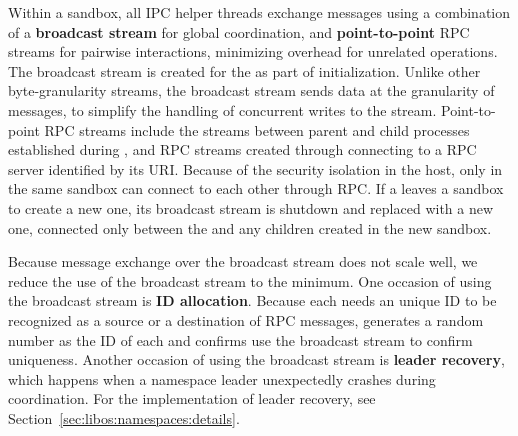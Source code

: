 Within a sandbox, all IPC helper threads exchange messages using a
combination of
a {\bf broadcast stream} for global coordination,
and {\bf point-to-point} RPC streams for pairwise interactions, 
minimizing overhead for unrelated operations.
The broadcast stream is created for the \picoproc{} as part of initialization.
Unlike other byte-granularity streams, the broadcast stream sends data at the granularity of messages,
to simplify the handling of concurrent writes to the stream.
Point-to-point RPC streams include the streams between parent and child processes established during ,
and RPC streams created through connecting to a RPC server
identified by its URI.
Because of the security isolation in the host,
only \picoprocs{} in the same sandbox can connect to each other through RPC.
If a \picoproc{} leaves a sandbox to create a new one,
its broadcast stream is shutdown and replaced
with a new one, connected only between the \picoproc{} and any children created in the
new sandbox.

Because message exchange over the broadcast stream does not scale well,
we reduce the use of the broadcast stream to the minimum.
One occasion of using the broadcast stream is
{\bf \picoproc{} ID allocation}.
Because each \picoproc{} needs an unique ID to be recognized as a source or a destination of RPC messages, \thelibos{} generates a random number as the ID of each \picoproc{} and confirms use the broadcast stream to confirm uniqueness.
Another occasion of using the broadcast stream
is {\bf leader recovery}, which happens when a namespace leader unexpectedly crashes
during coordination. For the implementation of leader recovery, see Section~\ref{sec:libos:namespaces:details}.


